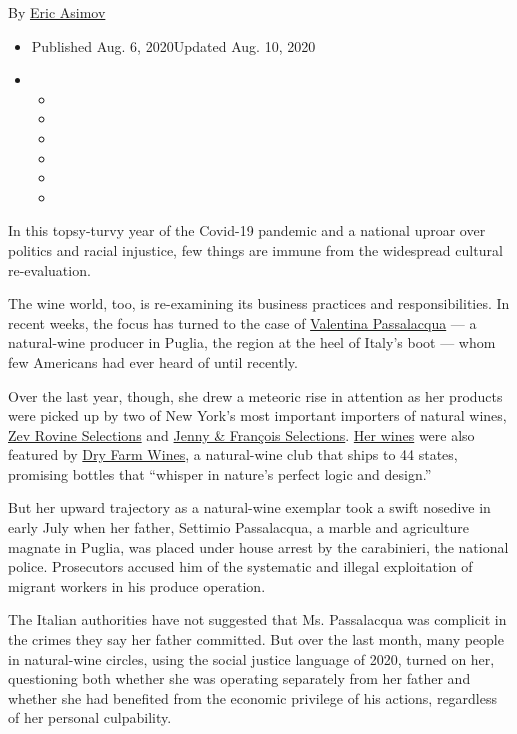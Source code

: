 By \href{https://www.nytimes3xbfgragh.onion/by/eric-asimov}{Eric Asimov}

\begin{itemize}
\item
  Published Aug. 6, 2020Updated Aug. 10, 2020
\item
  \begin{itemize}
  \item
  \item
  \item
  \item
  \item
  \item
  \end{itemize}
\end{itemize}

In this topsy-turvy year of the Covid-19 pandemic and a national uproar
over politics and racial injustice, few things are immune from the
widespread cultural re-evaluation.

The wine world, too, is re-examining its business practices and
responsibilities. In recent weeks, the focus has turned to the case of
\href{https://wonderwomenofwine.com/femmefriday-interviews/2020/2/28/valentina-passalacqua-22820}{Valentina
Passalacqua} --- a natural-wine producer in Puglia, the region at the
heel of Italy's boot --- whom few Americans had ever heard of until
recently.

Over the last year, though, she drew a meteoric rise in attention as her
products were picked up by two of New York's most important importers of
natural wines, \href{https://zrswines.com/}{Zev Rovine Selections} and
\href{http://www.jennyandfrancois.com/}{Jenny \& François Selections}.
\href{http://valentinapassalacqua.it/?lang=en}{Her wines} were also
featured by \href{https://www.dryfarmwines.com/}{Dry Farm Wines}, a
natural-wine club that ships to 44 states, promising bottles that
``whisper in nature's perfect logic and design.''

But her upward trajectory as a natural-wine exemplar took a swift
nosedive in early July when her father, Settimio Passalacqua, a marble
and agriculture magnate in Puglia, was placed under house arrest by the
carabinieri, the national police. Prosecutors accused him of the
systematic and illegal exploitation of migrant workers in his produce
operation.

The Italian authorities have not suggested that Ms. Passalacqua was
complicit in the crimes they say her father committed. But over the last
month, many people in natural-wine circles, using the social justice
language of 2020, turned on her, questioning both whether she was
operating separately from her father and whether she had benefited from
the economic privilege of his actions, regardless of her personal
culpability.

